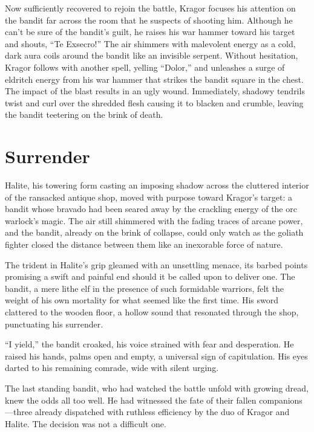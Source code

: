 \documentclass[
  letterpaper,12pt,twoside,twocolumn,openany,
  nodeprecatedcode,bg=full]{dndbook}
\begin{document}
Now sufficiently recovered to rejoin the battle, Kragor focuses his
attention on the bandit far across the room that he suspects of shooting
him. Although he can't be sure of the bandit's guilt, he raises his war
hammer toward his target and shouts, ``Te Exsecro!'' The air shimmers
with malevolent energy as a cold, dark aura coils around the bandit like
an invisible serpent. Without hesitation, Kragor follows with another
spell, yelling ``Dolor,'' and unleashes a surge of eldritch energy from
his war hammer that strikes the bandit square in the chest. The impact
of the blast results in an ugly wound. Immediately, shadowy tendrils
twist and curl over the shredded flesh causing it to blacken and
crumble, leaving the bandit teetering on the brink of death.

\section{Surrender}\label{surrender}

Halite, his towering form casting an imposing shadow across the
cluttered interior of the ransacked antique shop, moved with purpose
toward Kragor's target: a bandit whose bravado had been seared away by
the crackling energy of the orc warlock's magic. The air still shimmered
with the fading traces of arcane power, and the bandit, already on the
brink of collapse, could only watch as the goliath fighter closed the
distance between them like an inexorable force of nature.

The trident in Halite's grip gleamed with an unsettling menace, its
barbed points promising a swift and painful end should it be called upon
to deliver one. The bandit, a mere lithe elf in the presence of such
formidable warriors, felt the weight of his own mortality for what
seemed like the first time. His sword clattered to the wooden floor, a
hollow sound that resonated through the shop, punctuating his surrender.

``I yield,'' the bandit croaked, his voice strained with fear and
desperation. He raised his hands, palms open and empty, a universal sign
of capitulation. His eyes darted to his remaining comrade, wide with
silent urging.

The last standing bandit, who had watched the battle unfold with growing
dread, knew the odds all too well. He had witnessed the fate of their
fallen companions---three already dispatched with ruthless efficiency by
the duo of Kragor and Halite. The decision was not a difficult one.
\end{document}
